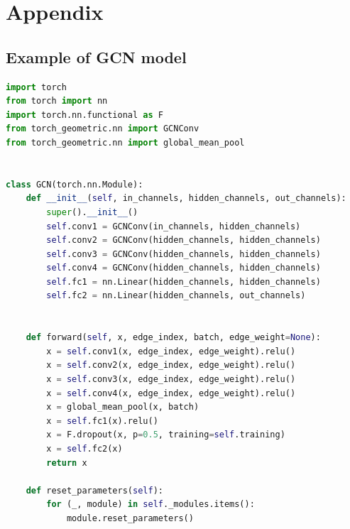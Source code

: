 \documentclass{article}
\begin{document}
\newpage


\newpage 

\section{Appendix} 
 
\subsection*{Example of GCN model}

\begin{lstlisting}[language=Python]
import torch
from torch import nn
import torch.nn.functional as F
from torch_geometric.nn import GCNConv
from torch_geometric.nn import global_mean_pool


class GCN(torch.nn.Module):
    def __init__(self, in_channels, hidden_channels, out_channels):
        super().__init__()
        self.conv1 = GCNConv(in_channels, hidden_channels)
        self.conv2 = GCNConv(hidden_channels, hidden_channels)
        self.conv3 = GCNConv(hidden_channels, hidden_channels)
        self.conv4 = GCNConv(hidden_channels, hidden_channels)
        self.fc1 = nn.Linear(hidden_channels, hidden_channels)
        self.fc2 = nn.Linear(hidden_channels, out_channels)


    def forward(self, x, edge_index, batch, edge_weight=None):
        x = self.conv1(x, edge_index, edge_weight).relu()
        x = self.conv2(x, edge_index, edge_weight).relu()
        x = self.conv3(x, edge_index, edge_weight).relu()
        x = self.conv4(x, edge_index, edge_weight).relu()
        x = global_mean_pool(x, batch)
        x = self.fc1(x).relu()
        x = F.dropout(x, p=0.5, training=self.training)
        x = self.fc2(x)
        return x
    
    def reset_parameters(self):
        for (_, module) in self._modules.items():
            module.reset_parameters()

\end{lstlisting}
\end{document}
